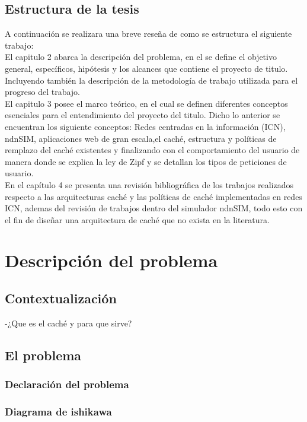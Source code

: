 \documentclass[12pt]{ociamthesis}  %
\begin{document}
\section{Estructura de la tesis}
A continuación se realizara una breve reseña de como se estructura el siguiente trabajo:\\

El capitulo 2 abarca la descripción del problema, en el se define el objetivo general, específicos, hipótesis y los alcances que contiene el proyecto de titulo. Incluyendo también la descripción de la metodología de trabajo utilizada para el progreso del trabajo.\\

El capitulo 3 posee el marco teórico, en el cual se definen diferentes conceptos esenciales para el entendimiento del proyecto del titulo. Dicho lo anterior se encuentran los siguiente conceptos: Redes centradas en la información (ICN), ndnSIM, aplicaciones web de gran escala,el caché, estructura y políticas de remplazo del caché existentes y finalizando con el comportamiento del usuario de manera donde se explica la ley de Zipf y se detallan los tipos de peticiones de usuario.\\

En el capítulo 4 se presenta una revisión bibliográfica de los trabajos realizados respecto a las arquitecturas caché y las políticas de caché implementadas en redes ICN, ademas del revisión de trabajos dentro del simulador ndnSIM, todo esto con el fin de diseñar una arquitectura de caché que no exista en la literatura.\\

\chapter{Descripción del problema}

\section{Contextualización}
-¿Que es el caché y para que sirve?
\section{El problema}
\subsection{Declaración del problema}
\subsection{Diagrama de ishikawa}
\end{document}

